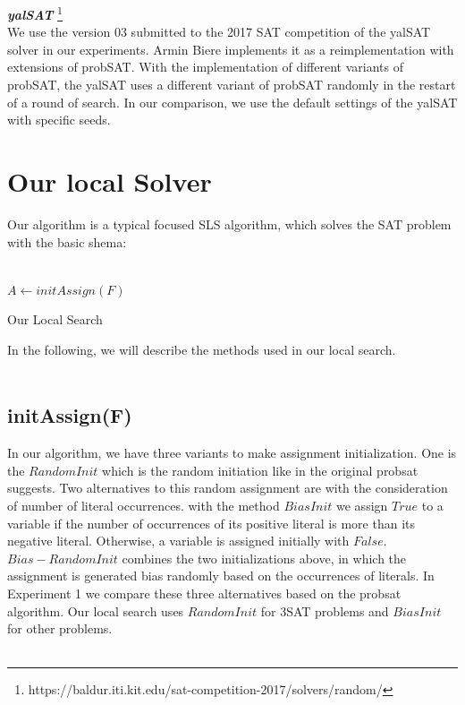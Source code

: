 \documentclass[12pt,a4paper,twoside]{scrartcl}
\numberwithin{equation}{section}
\begin{document}
\emph{\textbf{yalSAT}} \footnote{https://baldur.iti.kit.edu/sat-competition-2017/solvers/random/}\\
We use the version 03 submitted to the 2017 SAT competition of the yalSAT solver in our experiments. Armin Biere implements it as a reimplementation with extensions of probSAT.  With the implementation of different variants of probSAT, the yalSAT uses a different variant of probSAT randomly in the restart of a round of search. In our comparison, we use the default settings of the yalSAT with specific seeds.
\clearpage
\section{Our local Solver}
\label{sec:local}
 Our algorithm is a typical focused SLS algorithm, which solves the SAT problem with the basic shema:\\
\\
\begin{algorithm}[H]
  $A \leftarrow initAssign(F)$ \;
 \caption{Our Local Search}
\end{algorithm}
 In the following, we will describe the methods used in our local search.\\
\\
\subsection{initAssign(F)}
In our algorithm, we have three variants to make assignment initialization.
One is the $RandomInit$ which is the random initiation like in the original probsat suggests. Two alternatives to this random assignment are with the consideration of number of literal occurrences. with the method $BiasInit$ we assign $True$ to a variable if the number of occurrences of its positive literal is more than its negative literal. Otherwise, a variable is assigned initially with $False$. $Bias-RandomInit$ combines the two initializations above, in which the assignment is generated bias randomly based on the occurrences of literals.  In Experiment 1 we compare these three alternatives based on the probsat algorithm. Our local search uses $RandomInit$ for 3SAT problems and $BiasInit$ for other problems.\\
\\
\end{document}
